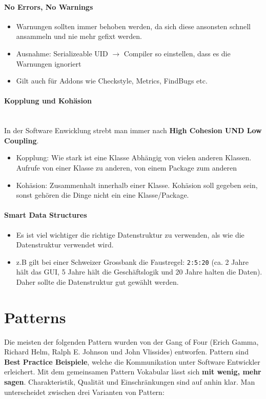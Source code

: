 \paragraph{No Errors, No Warnings}
\begin{itemize}
	\item Warnungen sollten immer behoben werden, da sich diese ansonsten schnell ansammeln und nie mehr gefixt werden.
	\item Ausnahme: Serializeable UID $\rightarrow$ Compiler so einstellen, dass es die Warnungen ignoriert
	\item Gilt auch für Addons wie Checkstyle, Metrics, FindBugs etc.
\end{itemize}
\paragraph{Kopplung und Kohäsion} \hfill \\
In der Software Enwicklung strebt man immer nach \textbf{High Cohesion UND Low Coupling}. 
\begin{itemize}
	\item Kopplung: Wie stark ist eine Klasse Abhängig von vielen anderen Klassen. Aufrufe von einer Klasse zu anderen, von einem Package zum anderen
	\item Kohäsion: Zusammenhalt innerhalb einer Klasse. Kohäsion soll gegeben sein, sonst gehören die Dinge nicht ein eine Klasse/Package.
\end{itemize}
\paragraph{Smart Data Structures}
\begin{itemize}
	\item Es ist viel wichtiger die richtige Datenstruktur zu verwenden, als wie die Datenstruktur verwendet wird.
	\item z.B gilt bei einer Schweizer Grossbank die Faustregel: \lstinline|2:5:20| (ca. 2 Jahre hält das GUI, 5 Jahre hält die Geschäftslogik und 20 Jahre halten die Daten). Daher sollte die Datenstruktur gut gewählt werden.
\end{itemize}


\section{Patterns}
Die meisten der folgenden Pattern wurden von der Gang of Four (Erich Gamma, Richard Helm, Ralph E. Johnson und John Vlissides) entworfen. Pattern sind \textbf{Best Practice Beispiele}, welche die Kommunikation unter Software Entwickler erleichert. Mit dem gemeinsamen Pattern Vokabular lässt sich \textbf{mit wenig, mehr sagen}. Charakteristik, Qualität und Einschränkungen sind auf anhin klar. Man unterscheidet zwischen drei Varianten von Pattern:

